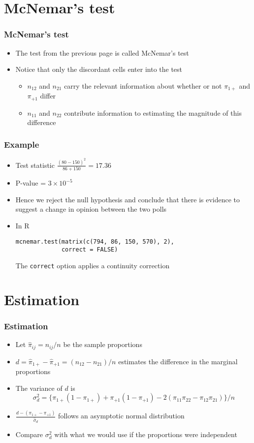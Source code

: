 \documentclass[aspectratio=169]{beamer}
\begin{document}
\section{McNemar's test}
\begin{frame}\frametitle{McNemar's test}
\begin{itemize}
\item The test from the previous page is called McNemar's test
\item Notice that only the discordant cells enter into the test
  \begin{itemize}
  \item $n_{12}$ and $n_{21}$ carry the relevant information about whether
    or not $\pi_{1+}$ and $\pi_{+1}$ differ
  \item $n_{11}$ and $n_{22}$ contribute information to estimating the
    magnitude of this difference
  \end{itemize}
\end{itemize}
\end{frame}

\begin{frame}[fragile]\frametitle{Example}
\begin{itemize}
\item Test statistic $\frac{(80 - 150)^2}{86 + 150} = 17.36$
\item P-value = $3\times 10^{-5}$
\item Hence we reject the null hypothesis and conclude that there is
evidence to suggest a change in opinion
between the two polls
\item In R
\begin{verbatim}
mcnemar.test(matrix(c(794, 86, 150, 570), 2), 
             correct = FALSE)
\end{verbatim}
The \texttt{correct} option applies a continuity correction
\end{itemize}
\end{frame}
 
\section{Estimation}
\begin{frame}\frametitle{Estimation}
\begin{itemize}
\item Let $\hat \pi_{ij} = n_{ij} / n$ be the sample proportions
\item $d = \hat \pi_{1+} - \hat \pi_{+1} = (n_{12} - n_{21})/n$ estimates the difference
  in the marginal proportions
\item The variance of $d$ is 
$$ 
  \sigma_d^2 = \{\pi_{1+}(1 - \pi_{1+}) + \pi_{+1}(1 - \pi_{+1}) - 2 (\pi_{11}\pi_{22} - \pi_{12}\pi_{21})\}/n
$$
\item $\frac{d - (\pi_{1+} - \pi_{+1})}{\hat \sigma_d}$ follows an asymptotic normal distribution
\item Compare $\sigma_d^2$ with what we would use if the proportions were independent
\end{itemize}
\end{frame}
\end{document}
